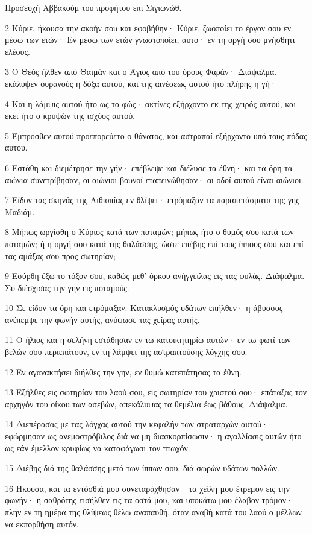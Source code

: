 \par Προσευχή Αββακούμ του προφήτου επί Σιγιωνώθ.
\par 2 Κύριε, ήκουσα την ακοήν σου και εφοβήθην· Κύριε, ζωοποίει το έργον σου εν μέσω των ετών· Εν μέσω των ετών γνωστοποίει, αυτό· εν τη οργή σου μνήσθητι ελέους.
\par 3 Ο Θεός ήλθεν από Θαιμάν και ο Άγιος από του όρους Φαράν· Διάψαλμα. εκάλυψεν ουρανούς η δόξα αυτού, και της αινέσεως αυτού ήτο πλήρης η γή·
\par 4 Και η λάμψις αυτού ήτο ως το φώς· ακτίνες εξήρχοντο εκ της χειρός αυτού, και εκεί ήτο ο κρυψών της ισχύος αυτού.
\par 5 Έμπροσθεν αυτού προεπορεύετο ο θάνατος, και αστραπαί εξήρχοντο υπό τους πόδας αυτού.
\par 6 Εστάθη και διεμέτρησε την γήν· επέβλεψε και διέλυσε τα έθνη· και τα όρη τα αιώνια συνετρίβησαν, οι αιώνιοι βουνοί εταπεινώθησαν· αι οδοί αυτού είναι αιώνιοι.
\par 7 Είδον τας σκηνάς της Αιθιοπίας εν θλίψει· ετρόμαξαν τα παραπετάσματα της γης Μαδιάμ.
\par 8 Μήπως ωργίσθη ο Κύριος κατά των ποταμών; μήπως ήτο ο θυμός σου κατά των ποταμών; ή η οργή σου κατά της θαλάσσης, ώστε επέβης επί τους ίππους σου και επί τας αμάξας σου προς σωτηρίαν;
\par 9 Εσύρθη έξω το τόξον σου, καθώς μεθ' όρκου ανήγγειλας εις τας φυλάς. Διάψαλμα. Συ διέσχισας την γην εις ποταμούς.
\par 10 Σε είδον τα όρη και ετρόμαξαν. Κατακλυσμός υδάτων επήλθεν· η άβυσσος ανέπεμψε την φωνήν αυτής, ανύψωσε τας χείρας αυτής.
\par 11 Ο ήλιος και η σελήνη εστάθησαν εν τω κατοικητηρίω αυτών· εν τω φωτί των βελών σου περιεπάτουν, εν τη λάμψει της αστραπτούσης λόγχης σου.
\par 12 Εν αγανακτήσει διήλθες την γην, εν θυμώ κατεπάτησας τα έθνη.
\par 13 Εξήλθες εις σωτηρίαν του λαού σου, εις σωτηρίαν του χριστού σου· επάταξας τον αρχηγόν του οίκου των ασεβών, απεκάλυψας τα θεμέλια έως βάθους. Διάψαλμα.
\par 14 Διεπέρασας με τας λόγχας αυτού την κεφαλήν των στραταρχών αυτού· εφώρμησαν ως ανεμοστρόβιλος διά να μη διασκορπίσωσιν· η αγαλλίασις αυτών ήτο ως εάν έμελλον κρυφίως να καταφάγωσι τον πτωχόν.
\par 15 Διέβης διά της θαλάσσης μετά των ίππων σου, διά σωρών υδάτων πολλών.
\par 16 Ήκουσα, και τα εντόσθιά μου συνεταράχθησαν· τα χείλη μου έτρεμον εις την φωνήν· η σαθρότης εισήλθεν εις τα οστά μου, και υποκάτω μου έλαβον τρόμον· πλην εν τη ημέρα της θλίψεως θέλω αναπαυθή, όταν αναβή κατά του λαού ο μέλλων να εκπορθήση αυτόν.
